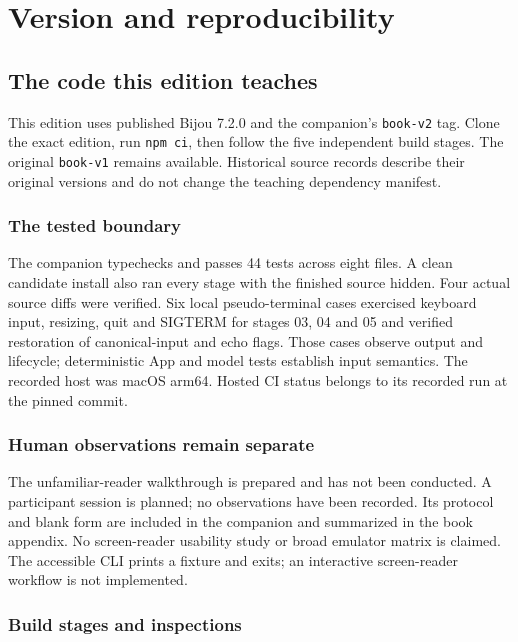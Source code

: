 \chapter*{Version and reproducibility}\label{book-reproducibility}

\section*{The code this edition teaches}

This edition uses published Bijou 7.2.0 and the companion's \texttt{book-v2} tag. Clone the exact edition, run \texttt{npm ci}, then follow the five independent build stages. The original \texttt{book-v1} remains available. Historical source records describe their original versions and do not change the teaching dependency manifest.



\subsection*{The tested boundary}

The companion typechecks and passes 44 tests across eight files. A clean candidate install also ran every stage with the finished source hidden. Four actual source diffs were verified. Six local pseudo-terminal cases exercised keyboard input, resizing, quit and SIGTERM for stages 03, 04 and 05 and verified restoration of canonical-input and echo flags. Those cases observe output and lifecycle; deterministic App and model tests establish input semantics. The recorded host was macOS arm64. Hosted CI status belongs to its recorded run at the pinned commit.

\subsection*{Human observations remain separate}

The unfamiliar-reader walkthrough is prepared and has not been conducted. A participant session is planned; no observations have been recorded. Its protocol and blank form are included in the companion and summarized in the book appendix. No screen-reader usability study or broad emulator matrix is claimed. The accessible CLI prints a fixture and exits; an interactive screen-reader workflow is not implemented.

\subsection*{Build stages and inspections}

